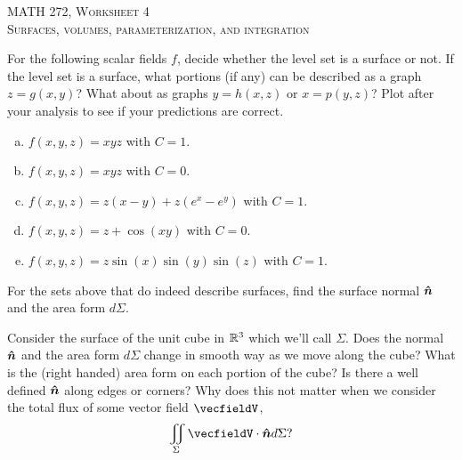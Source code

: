 \documentclass[12pt]{article} %
\begin{document}
\begin{center}
   \textsc{\large MATH 272, Worksheet 4}\\
   \textsc{Surfaces, volumes, parameterization, and integration}
\end{center}
\vspace{.5cm}

\begin{problem}
    For the following scalar fields $f$, decide whether the level set is a surface or not. If the level set is a surface, what portions (if any) can be described as a graph $z=g(x,y)$?  What about as graphs $y=h(x,z)$ or $x=p(y,z)$? Plot after your analysis to see if your predictions are correct.
    \begin{enumerate}[(a)]
        \item $f(x,y,z)=xyz$ with $C=1$.
        \item $f(x,y,z)=xyz$ with $C=0$.
        \item $f(x,y,z) = z(x-y)+z(e^x-e^y)$ with $C=1$.
        \item $f(x,y,z) = z + \cos(xy)$ with $C=0$.
        \item $f(x,y,z) = z\sin(x)\sin(y)\sin(z)$ with $C=1$.
    \end{enumerate}
\end{problem}

\begin{problem}
    For the sets above that do indeed describe surfaces, find the surface normal $\boldsymbol{\hat{n}}$ and the area form $d\Sigma$.
\end{problem}

\begin{problem}
    Consider the surface of the unit cube in $\mathbb{R}^3$ which we'll call $\Sigma$.  Does the normal $\boldsymbol{\hat{n}}$ and the area form $d\Sigma$ change in smooth way as we move along the cube?  What is the (right handed) area form on each portion of the cube? Is there a well defined $\boldsymbol{\hat{n}}$ along edges or corners? Why does this not matter when we consider the total flux of some vector field $\vecfieldV$,
    \[
        \iint_\Sigma \vecfieldV \cdot \unitvec d\Sigma?
    \]
\end{problem}
\end{document}
